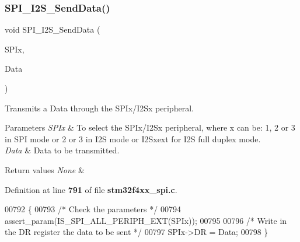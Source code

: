\subsubsection{S\+P\+I\+\_\+\+I2\+S\+\_\+\+Send\+Data()}
{\footnotesize\ttfamily void S\+P\+I\+\_\+\+I2\+S\+\_\+\+Send\+Data (\begin{DoxyParamCaption}\item[{\textbf{ S\+P\+I\+\_\+\+Type\+Def} $\ast$}]{S\+P\+Ix,  }\item[{uint16\+\_\+t}]{Data }\end{DoxyParamCaption})}



Transmits a Data through the S\+P\+Ix/\+I2\+Sx peripheral. 


\begin{DoxyParams}{Parameters}
{\em S\+P\+Ix} & To select the S\+P\+Ix/\+I2\+Sx peripheral, where x can be\+: 1, 2 or 3 in S\+PI mode or 2 or 3 in I2S mode or I2\+Sxext for I2S full duplex mode. \\
\hline
{\em Data} & Data to be transmitted. \\
\hline
\end{DoxyParams}

\begin{DoxyRetVals}{Return values}
{\em None} & \\
\hline
\end{DoxyRetVals}


Definition at line \textbf{ 791} of file \textbf{ stm32f4xx\+\_\+spi.\+c}.


\begin{DoxyCode}
00792 \{
00793   \textcolor{comment}{/* Check the parameters */}
00794   assert_param(IS_SPI_ALL_PERIPH_EXT(SPIx));
00795   
00796   \textcolor{comment}{/* Write in the DR register the data to be sent */}
00797   SPIx->DR = Data;
00798 \}
\end{DoxyCode}
